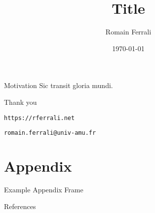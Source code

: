 \documentclass[aspectratio=169,10pt]{beamer}
\title{Title}
\author{Romain Ferrali}
\institute{Aix-Marseille School of Economics}
\date{\today}
\begin{document}
\maketitle

\begin{frame}{Motivation}
  \hypertarget{starting_page}{}
  Sic transit gloria mundi.
  \hyperlink{appendix}{}
\end{frame}

\begin{frame}[standout]
  \Large{Thank you}
  \vspace{1em}

  \small{{\tt https://rferrali.net}}

  \small{{\tt romain.ferrali@univ-amu.fr}}
\end{frame}

\appendix
\section{Appendix}

\begin{frame}{Example Appendix Frame}
  \hypertarget{appendix}{}
  \hyperlink{starting_page}{}
\end{frame}

\begin{frame}[allowframebreaks]{References}
  \tiny
  \begingroup
  \renewcommand{\section}[2]{} %
  \endgroup
\end{frame}
\end{document}
